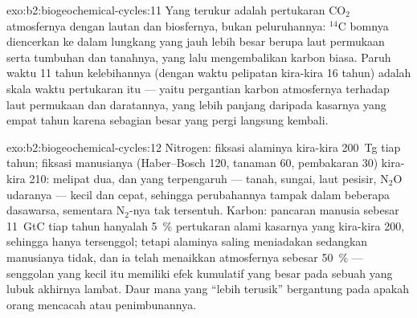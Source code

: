 \begin{solution}{exo:b2:biogeochemical-cycles:11}
Yang terukur adalah pertukaran $\mathrm{CO_2}$ atmosfernya dengan
lautan dan biosfernya, bukan peluruhannya: $\mathrm{{}^{14}C}$ bomnya
diencerkan ke dalam lungkang yang jauh lebih besar berupa laut
permukaan serta tumbuhan dan tanahnya, yang lalu mengembalikan karbon
biasa. Paruh waktu 11 tahun kelebihannya (dengan waktu pelipatan
kira-kira 16 tahun) adalah skala waktu pertukaran itu --- yaitu
pergantian karbon atmosfernya terhadap laut permukaan dan daratannya,
yang lebih panjang daripada  kasarnya yang empat tahun
karena sebagian besar yang pergi langsung kembali.
\end{solution}

\begin{solution}{exo:b2:biogeochemical-cycles:12}
Nitrogen: fiksasi alaminya kira-kira 200~Tg tiap tahun; fiksasi
manusianya (Haber--Bosch 120, tanaman 60, pembakaran 30) kira-kira 210:
 melipat dua, dan  yang terpengaruh --- tanah, sungai,
laut pesisir, $\mathrm{N_2O}$ udaranya --- kecil dan cepat, sehingga
perubahannya tampak dalam beberapa dasawarsa, sementara 
$\mathrm{N_2}$-nya tak tersentuh. Karbon: pancaran manusia sebesar
11~GtC tiap tahun hanyalah \qty{5}{\%} pertukaran alami kasarnya yang
kira-kira 200, sehingga  hanya tersenggol; tetapi 
alaminya saling meniadakan sedangkan  manusianya tidak, dan ia
telah menaikkan  atmosfernya sebesar \qty{50}{\%} --- senggolan
yang kecil itu memiliki efek kumulatif yang besar pada sebuah 
yang lubuk akhirnya lambat. Daur mana yang ``lebih terusik'' bergantung
pada apakah orang mencacah  atau penimbunannya.
\end{solution}


